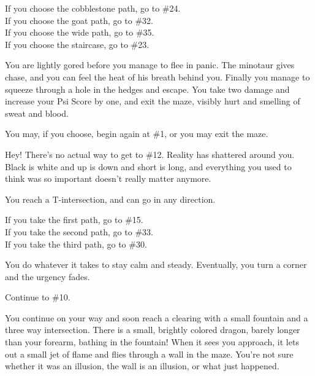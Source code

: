 \documentclass[green]{gl2018}
\begin{document}
\begin{LARGE}
\begin{location}{10}
\begin{fromhere}
If you choose the cobblestone path, go to \#24.\\
  If you choose the goat path, go to \#32.\\
  If you choose the wide path, go to \#35.\\
  If you choose the staircase, go to \#23.
\end{fromhere}
\end{location}
\begin{location}{11}
You are lightly gored before you manage to flee in panic.  The minotaur gives chase, and you can feel the heat of his breath behind you.  Finally you manage to squeeze through a hole in the hedges and escape.  You take two damage and increase your Psi Score by one, and exit the maze, visibly hurt and smelling of sweat and blood.  
\begin{fromhere}
You may, if you choose, begin again at \#1, or you may exit the maze.
\end{fromhere}
\end{location}
\begin{location}{12}
Hey!  There's no actual way to get to \#12.  Reality has shattered around you.  Black is white and up is down and short is long, and everything you used to think was so important doesn't really matter anymore.  
\end{location}
\begin{location}{13}
You reach a T-intersection, and can go in any direction.
\begin{fromhere}
  If you take the first path, go to \#15.\\
 If you take the second path, go to \#33.\\
 If you take the third path, go to \#30.
\end{fromhere}
\end{location}
\begin{location}{14}
You do whatever it takes to stay calm and steady.  Eventually, you turn a corner and the urgency fades. 
\begin{fromhere}Continue to \#10.\end{fromhere}\end{location}
\begin{location}{15}
You continue on your way and soon reach a clearing with a small fountain and a three way intersection.  There is a small, brightly colored dragon, barely longer than your forearm, bathing in the fountain!  When it sees you approach, it lets out a small jet of flame and flies through a wall in the maze.  You're not sure whether it was an illusion, the wall is an illusion, or what just happened.


\end{location}
\end{LARGE}
\end{document}
